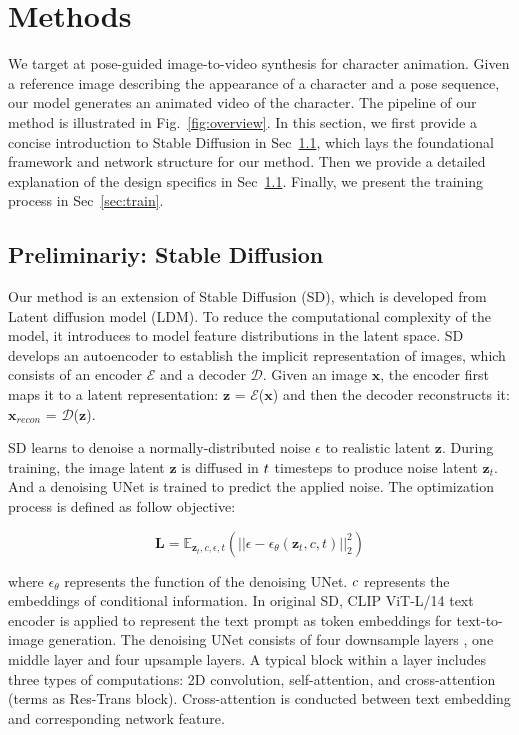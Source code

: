 \section{Methods}
We target at pose-guided image-to-video synthesis for character animation. Given a reference image describing the appearance of a character and a pose sequence, our model generates an animated video of the character. The pipeline of our method is illustrated in Fig.~\ref{fig:overview}. In this section, we first provide a concise introduction to Stable Diffusion in Sec~\ref{sec:sd}, which lays the foundational framework and network structure for our method. Then we provide a detailed explanation of the design specifics in Sec~\ref{sec:sd}. Finally, we present the training process in Sec~\ref{sec:train}.

\subsection{Preliminariy: Stable Diffusion}\label{sec:sd}
Our method is an extension of Stable Diffusion (SD), which is developed from Latent diffusion model (LDM). To reduce the computational complexity of the model, it introduces to model feature distributions in the latent space. SD develops an autoencoder\cite{vae,vqvae} to establish the implicit representation of images, which consists of an encoder $\mathcal E$ and a decoder $\mathcal D$. Given an image $\mathbf x$, the encoder first maps it to a latent representation: $\mathbf z$ = $\mathcal E$($\mathbf x$) and then the decoder reconstructs it: ${\mathbf x}_{recon}$ = $\mathcal D$($\mathbf z$). 

SD learns to denoise a normally-distributed noise $\epsilon$ to realistic latent $\mathbf z$. During training, the image latent $\mathbf z$ is diffused in $\mathnormal t$ timesteps to produce noise latent ${\mathbf z}_{t}$. And a denoising UNet is trained to predict the applied noise. The optimization process is defined as follow objective:

\begin{equation}
\label{eq1}
    {\mathbf L} = {\mathbb E}_{{\mathbf z}_{t},c,{\epsilon},t}({||{\epsilon}-{{\epsilon}_{\theta}}({\mathbf z}_{t},c,t)||}^{2}_{2})
\end{equation}

\noindent
where ${\epsilon}_{\theta}$ represents the function of the denoising UNet. $\mathnormal c$ represents the embeddings of conditional information. In original SD, CLIP ViT-L/14\cite{vit} text encoder is applied to represent the text prompt as token embeddings for text-to-image generation. The denoising UNet consists of four downsample layers , one middle layer and four upsample layers. A typical block within a layer includes three types of computations: 2D convolution, self-attention\cite{attention}, and cross-attention (terms as Res-Trans block). Cross-attention is conducted between text embedding and corresponding network feature. 

